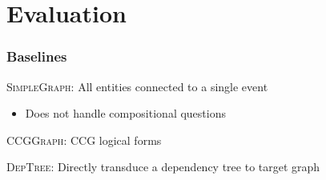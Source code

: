 \documentclass[mathserif,12pt]{beamer}
\newcommand \ignore[1]{}
\newcommand{\hlight}[1]{{\color{blue!80} #1}}
\newcommand \free{Free917\xspace}
\newcommand \webq{WebQuestions\xspace}
\newcommand \deptree{\textsc{DepTree}\xspace}
\newcommand \simplegraph{\textsc{SimpleGraph}\xspace}
\newcommand \ccggraph{\textsc{CCGGraph}\xspace}
\begin{document}
\section{Evaluation}

\ignore{
\begin{frame}
\frametitle{Training and Evaluation Data}
  \begin{itemize}
     
    \item[] \webq [Berant et al., 2013] 
  	\begin{itemize}
	  \item Google search queries starting with \textit{wh} question words.
	  \item 3030 train, 2780 test
	\end{itemize}
    
    \vspace{0.5cm}
    \item[] \free [Cai and Yates, 2013] 
  	\begin{itemize}
  	 \item Manually curated questions
	 \item 641 train, 276 test
  	\end{itemize}

    \vspace{0.5cm}	 
    \item[] 30\% of training for development
  \end{itemize}
\end{frame}
}

\begin{frame}
\frametitle{Baselines}
\hlight{\simplegraph: }All entities connected to a single event
\begin{itemize}
 \item Does not handle compositional questions%
\end{itemize}

\pause

\vspace{0.9cm} 
\hlight{\ccggraph: } CCG logical forms 

\pause
\vspace{0.9cm}
\hlight{\deptree:} Directly transduce a dependency tree to target graph \\

\end{frame}
\end{document}
